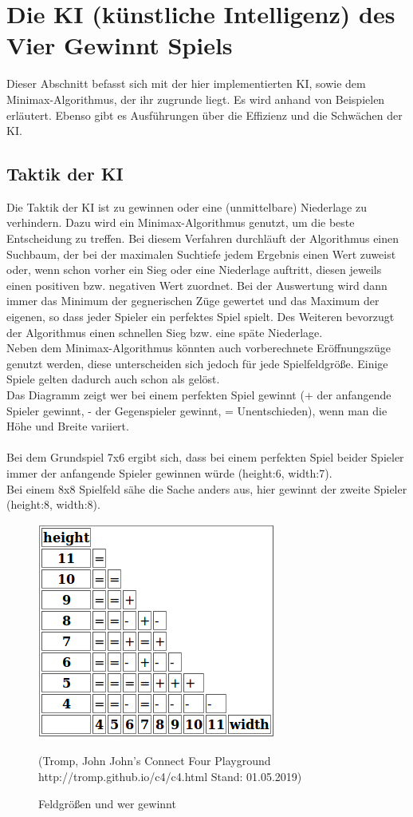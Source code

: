 \documentclass[12pt,a4paper]{article}
\begin{document}
	\section{Die KI (künstliche Intelligenz) des Vier Gewinnt Spiels}
	Dieser Abschnitt befasst sich mit der hier implementierten KI, sowie dem Minimax-Algorithmus, der ihr zugrunde liegt. Es wird anhand von Beispielen erläutert. Ebenso gibt es Ausführungen über die Effizienz und die Schwächen der KI.\\
	\subsection{Taktik der KI}
	Die Taktik der KI ist zu gewinnen oder eine (unmittelbare) Niederlage zu verhindern. Dazu wird ein Minimax-Algorithmus genutzt, um die beste Entscheidung zu treffen. Bei diesem Verfahren durchläuft der Algorithmus einen Suchbaum, der bei der maximalen Suchtiefe jedem Ergebnis einen Wert zuweist oder, wenn schon vorher ein Sieg oder eine Niederlage auftritt, diesen jeweils einen positiven bzw. negativen Wert zuordnet. Bei der Auswertung wird dann immer das Minimum der gegnerischen Züge gewertet und das Maximum der eigenen, so dass jeder Spieler ein \glqq perfektes\grqq{} Spiel spielt. Des Weiteren bevorzugt der Algorithmus einen schnellen Sieg bzw. eine späte Niederlage.\\
	Neben dem Minimax-Algorithmus könnten auch vorberechnete Eröffnungszüge genutzt werden, diese unterscheiden sich jedoch für jede Spielfeldgröße. Einige Spiele gelten dadurch auch schon als gelöst.\\
	Das Diagramm zeigt wer bei einem perfekten Spiel gewinnt (+ der anfangende Spieler gewinnt, - der Gegenspieler gewinnt, = Unentschieden), wenn man die Höhe und Breite variiert.\\\\ Bei dem Grundspiel 7x6 ergibt sich, dass bei einem perfekten Spiel beider Spieler immer der anfangende Spieler gewinnen würde (height:6, width:7).\\
	Bei einem 8x8 Spielfeld sähe die Sache anders aus, hier gewinnt der zweite Spieler (height:8, width:8).
	\begin{figure}[h]
		\centering
		\includegraphics[width=0.5\linewidth, height=0.3\textheight]{w-h-viergew}
		\caption{Feldgrößen und wer gewinnt}
		\label{fig:w-h-viergew}
		(Tromp, John  \glqq John's Connect Four Playground\grqq{} http://tromp.github.io/c4/c4.html Stand: 01.05.2019)
	\end{figure}
	\\\\\\
\end{document}
